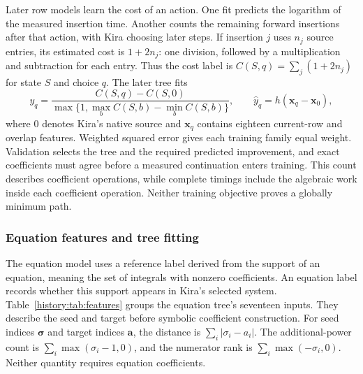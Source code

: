 Later row models learn the cost of an action. One fit predicts the logarithm of the measured insertion time. Another counts the remaining forward insertions after that action, with Kira choosing later steps. If insertion $j$ uses $n_j$ source entries, its estimated cost is $1+2n_j$: one division, followed by a multiplication and subtraction for each entry. Thus the cost label is $C(S,q)=\sum_j(1+2n_j)$ for state $S$ and choice $q$. The later tree fits
\begin{equation}
 y_q=\frac{C(S,q)-C(S,0)}{\max\{1,\max_b C(S,b)-\min_b C(S,b)\}},
 \qquad \widehat y_q=h(\boldsymbol x_q-\boldsymbol x_0),
\end{equation}
where $0$ denotes Kira's native source and $\boldsymbol x_q$ contains eighteen current-row and overlap features. Weighted squared error gives each training family equal weight. Validation selects the tree and the required predicted improvement, and exact coefficients must agree before a measured continuation enters training. This count describes coefficient operations, while complete timings include the algebraic work inside each coefficient operation. Neither training objective proves a globally minimum path.

\subsubsection{Equation features and tree fitting}
The equation model uses a reference label derived from the support of an equation, meaning the set of integrals with nonzero coefficients. An equation label records whether this support appears in Kira's selected system. Table~\ref{history:tab:features} groups the equation tree's seventeen inputs. They describe the seed and target before symbolic coefficient construction. For seed indices $\boldsymbol\sigma$ and target indices $\boldsymbol a$, the distance is $\sum_i|\sigma_i-a_i|$. The additional-power count is $\sum_i\max(\sigma_i-1,0)$, and the numerator rank is $\sum_i\max(-\sigma_i,0)$. Neither quantity requires equation coefficients.

